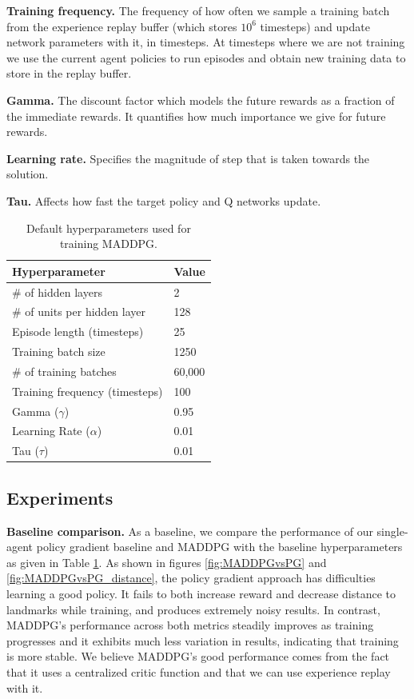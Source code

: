 \documentclass{article}
\begin{document}
\textbf{Training frequency.} The frequency of how often we sample a training batch from the experience replay buffer (which stores $10^6$ timesteps) and update network parameters with it, in timesteps. At timesteps where we are not training we use the current agent policies to run episodes and obtain new training data to store in the replay buffer.

\textbf{Gamma.} The discount factor which models the future rewards as a fraction of the immediate rewards. It quantifies how much importance we give for future rewards.

\textbf{Learning rate.} Specifies the magnitude of step that is taken towards the solution. 

\textbf{Tau.} Affects how fast the target policy and Q networks update. 

\begin{table}[h!]
  \begin{center}
    
    \begin{tabular} {|l|l|} %
      \hline
      \textbf{Hyperparameter} & \textbf{Value} \\
      \hline
      \# of hidden layers & 2 \\
      \# of units per hidden layer & 128 \\
      Episode length (timesteps) & 25 \\
      Training batch size & 1250 \\
      \# of training batches & 60,000 \\
			Training frequency (timesteps) & 100 \\
      Gamma ($\gamma$) & 0.95 \\
      Learning Rate ($\alpha$) & 0.01 \\
			Tau ($\tau$) & 0.01 \\
      \hline
    \end{tabular}
  \end{center}
	\caption{Default hyperparameters used for training MADDPG.}
	\label{tab:basecase_parameters}
\end{table}

\subsection{Experiments}

\textbf{Baseline comparison.} As a baseline, we compare the performance of our single-agent policy gradient baseline and MADDPG with the baseline hyperparameters as given in Table \ref{tab:basecase_parameters}. As shown in figures \ref{fig:MADDPGvsPG} and \ref{fig:MADDPGvsPG_distance}, the policy gradient approach has difficulties learning a good policy. It fails to both increase reward and decrease distance to landmarks while training, and produces extremely noisy results. In contrast, MADDPG's performance across both metrics steadily improves as training progresses and it exhibits much less variation in results, indicating that training is more stable. We believe MADDPG's good performance comes from the fact that it uses a centralized critic function and that we can use experience replay with it.
\end{document}
